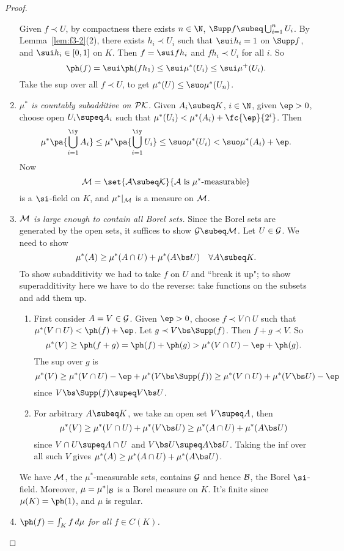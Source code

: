 \begin{proof}
\begin{enumerate}
Given $f\prec U$, by compactness there exists $n\in \N$, $\Supp f\subeq \bigcup_{i=1}^n U_i$. By Lemma~\ref{lem:f3-2}(2), there exists $h_i\prec U_i$ such that $\sui h_i=1$ on $\Supp f$, and $\sui h_i\in [0,1]$ on $K$. Then $f=\sui fh_i$ and $fh_i\prec U_i$ for all $i$. So
\[
\ph(f)=\sui \ph(fh_1)\le \sui \mu^*(U_i) \le \sui \mu^+(U_i).
\]
Take the sup over all $f\prec U$, to get $\mu^*(U)\le \suo \mu^*(U_n)$.
\item
{\it $\mu^*$ is countably subadditive on $\cal PK$.} Given $A_i\subeq K$, $i\in \N$, given $\ep>0$, choose open $U_i\supeq A_i$ such that $\mu^*(U_i)<  \mu^*(A_i)+\fc{\ep}{2^i}$. Then
\[
\mu^*\pa{\bigcup_{i=1}^{\iy} A_i}\le \mu^*\pa{\bigcup_{i=1}^{\iy}U_i} \le \suo \mu^*(U_i)<\suo \mu^*(A_i)+\ep.
\]
Now 
\[
\cal M=\set{A\subeq K}{A\text{ is }\mu^*\text{-measurable}}
\]
is a $\si$-field on $K$, and $\mu^*|_{\cal M}$ is a measure on $\cal M$.
\item
{\it $\cal M$ is large enough to contain all Borel sets.} Since the Borel sets are generated by the open sets, it suffices to show $\cal G\subeq \cal M$. Let $U\in \cal G$. We need to show
\[
\mu^*(A)\ge \mu^*(A\cap U)+\mu^*(A\bs U) \quad \forall A\subeq K.
\]
To show subadditivity we had to take $f$ on $U$ and ``break it up"; to show superadditivity here we have to do the reverse: take functions on the subsets and add them up.
\begin{enumerate}
\item
First consider $A=V\in \cal G$. Given $\ep>0$, choose $f\prec V\cap U$ such that $\mu^*(V\cap U)<\ph(f)+\ep$. Let $g\prec V\bs \Supp(f)$. Then $f+g\prec V$. So
\[
\mu^*(V)\ge \ph(f+g)=\ph(f)+\ph(g)>\mu^*(V\cap U)-\ep+\ph(g).
\]
The sup over $g$ is 
\[
\mu^*(V)\ge \mu^*(V\cap U)-\ep+\mu^*(V\bs \Supp(f))
\ge \mu^*(V\cap U)+\mu^*(V\bs U)-\ep
\]
since $V\bs \Supp(f)\supeq V\bs U$.
\item
For arbitrary $A\subeq K$, we take an open set $V\supeq A$, then
\[
\mu^*(V) \ge \mu^*(V\cap U)+\mu^*(V\bs U) \ge \mu^*(A\cap U)+\mu^*(A\bs U)
\]
since $V\cap U\supeq A\cap U$ and $V\bs U \supeq A\bs U$. Taking the inf over all such $V$ gives $\mu^*(A)\ge \mu^*(A\cap U)+\mu^* (A\bs U)$.  %
\end{enumerate}
We have $\cal M$, the $\mu^*$-measurable sets, contains $\cal G$ and hence $\cal B$, the Borel $\si$-field. Moreover, $\mu=\mu^*|_{\cal B}$ is a Borel measure on $K$. It's finite since $\mu(K)=\ph(1)$, and $\mu$ is regular.
\item{\it $\ph(f)=\int_K f\,d\mu$ for all $f\in C(K)$. }


\end{enumerate}
\end{proof}
